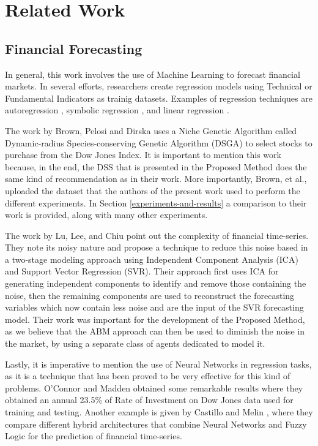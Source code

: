 \section{Related Work}
\label{section:related-work}

\subsection{Financial Forecasting}
\label{financial-forecasting}

In general, this work involves the use of Machine Learning to forecast
financial markets. In several efforts, researchers create regression
models using Technical or Fundamental Indicators as trainig
datasets. Examples of regression techniques are autoregression
\cite{burg1968new}, symbolic regression \cite{billard2002symbolic},
and linear regression \cite{kutner2004applied}.

The work by Brown, Pelosi and Dirska \cite{brown2013dynamic} uses a
Niche Genetic Algorithm called Dynamic-radius Species-conserving
Genetic Algorithm (DSGA) to select stocks to purchase from the Dow
Jones Index. It is important to mention this work because, in the end,
the DSS that is presented in the Proposed Method does the same kind of
recommendation as in their work. More importantly, Brown, et al.,
uploaded the dataset that the authors of the present work used to
perform the different experiments. In Section
\ref{experiments-and-results} a comparison to their work is provided,
along with many other experiments.

The work by Lu, Lee, and Chiu \cite{Lu2009} point out the complexity
of financial time-series. They note its noisy nature and propose a
technique to reduce this noise based in a two-stage modeling approach
using Independent Component Analysis (ICA) and Support Vector
Regression (SVR). Their approach first uses ICA for generating
independent components to identify and remove those containing the
noise, then the remaining components are used to reconstruct the
forecasting variables which now contain less noise and are the input
of the SVR forecasting model. Their work was important for the
development of the Proposed Method, as we believe that the ABM
approach can then be used to diminish the noise in the market, by
using a separate class of agents dedicated to model it.

Lastly, it is imperative to mention the use of Neural Networks in
regression tasks, as it is a technique that has been proved to be very
effective for this kind of problems. O'Connor and Madden
\cite{Connor2005} obtained some remarkable results where they obtained
an annual 23.5\% of Rate of Investment on Dow Jones data used for
training and testing. Another example is given by Castillo and Melin
\cite{castillo2001simulation}, where they compare different hybrid
architectures that combine Neural Networks and Fuzzy Logic for the
prediction of financial time-series.

